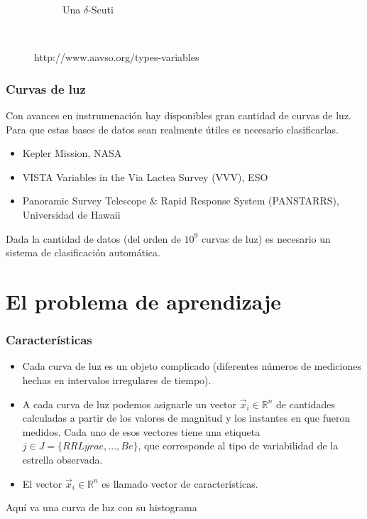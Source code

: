 \documentclass{beamer}
\begin{document}
\begin{frame}
\begin{figure}
\begin{subfigure}[b]{0.4\textwidth}
      \caption{Una $\delta$-Scuti}
      \label{fig:tiger}
    \end{subfigure}
    ~ %
    \caption{http://www.aavso.org/types-variables}\label{fig:animals}
  \end{figure}

\end{frame}

\begin{frame}
  \frametitle{Curvas de luz}
  Con avances en instrumenación hay disponibles gran cantidad de curvas de luz. Para que estas bases de datos sean realmente útiles es necesario clasificarlas. 
  \begin{itemize}
  \item Kepler Mission, NASA
  \item VISTA Variables in the Via Lactea Survey (VVV), ESO
  \item Panoramic Survey Telescope \& Rapid Response System (PANSTARRS), Universidad de Hawaii
  \end{itemize}
  Dada la cantidad de datos (del orden de $10^9$ curvas de luz) es necesario un sistema de clasificación automática.
\end{frame}


\section{El problema de aprendizaje}
\begin{frame}%
  \frametitle{Características}
\begin{itemize}
   \item Cada curva de luz es un objeto complicado (diferentes números de mediciones hechas en intervalos irregulares de tiempo).  
   \item A cada curva de luz podemos asignarle un vector $\vec{x}_i\in\mathbb{R}^n$ de cantidades calculadas a partir de los valores de magnitud y los instantes en que fueron medidos. Cada uno de esos vectores tiene una etiqueta $j\in J = \{RR Lyrae,..., Be\}$, que corresponde al tipo de variabilidad de la estrella observada.
     \item El vector $\vec{x}_i\in\mathbb{R}^n$  es llamado vector de características.
\end{itemize}
\end{frame}

\begin{frame}
  Aquí va una curva de luz con su histograma
\end{frame}
\end{document}
